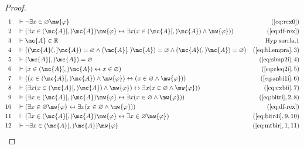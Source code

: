 \begin{proof}
\begin{align}
  1 &&  & \vdash \lnot \exists x \in \varnothing
     \mw{\varphi}&(\mbox{\ref{eq:rex0}})\notag
  \\ 2 &&  & \vdash ( \exists x \in ( \mc{A} [,) \mc{A} ) \mw{\varphi} \leftrightarrow
     \exists x ( x \in ( \mc{A} [,) \mc{A} ) \wedge \mw{\varphi} )
     )&(\mbox{\ref{eq:df-rex}})\notag
  \\ 3 &&  & \vdash \mc{A} \in \mathbb{R}&\text{Hyp~sorrla.1}\notag%
  \\ 4 &&  & \vdash ( ( \mc{A} (,] \mc{A} ) = \varnothing \wedge ( \mc{A} [,) \mc{A} ) =
     \varnothing \wedge ( \mc{A} (,) \mc{A} ) = \varnothing
     )&(\mbox{\ref{eq:bl.empra}},3)\notag
  \\ 5 &&  & \vdash ( \mc{A} [,) \mc{A} ) = \varnothing&(\mbox{\ref{eq:simp2i}},4)\notag
  \\ 6 &&  & \vdash ( x \in ( \mc{A} [,) \mc{A} ) \leftrightarrow x \in \varnothing
     )&(\mbox{\ref{eq:eleq2i}},5)\notag
  \\ 7 &&  & \vdash ( ( x \in ( \mc{A} [,) \mc{A} ) \wedge \mw{\varphi} ) \leftrightarrow
     ( x \in \varnothing \wedge \mw{\varphi} )
     )&(\mbox{\ref{eq:anbi1i}},6)\notag
  \\ 8 &&  & \vdash ( \exists x ( x \in ( \mc{A} [,) \mc{A} ) \wedge \mw{\varphi} )
     \leftrightarrow \exists x ( x \in \varnothing \wedge
     \mw{\varphi} ) )&(\mbox{\ref{eq:exbii}},7)\notag
  \\ 9 &&  & \vdash ( \exists x \in ( \mc{A} [,) \mc{A} ) \mw{\varphi} \leftrightarrow
     \exists x ( x \in \varnothing \wedge \mw{\varphi} )
     )&(\mbox{\ref{eq:bitri}},2,8)\notag
  \\ 10 &&  & \vdash ( \exists x \in \varnothing \mw{\varphi} \leftrightarrow
     \exists x ( x \in \varnothing \wedge \mw{\varphi} )
     )&(\mbox{\ref{eq:df-rex}})\notag
  \\ 11 &&  & \vdash ( \exists x \in ( \mc{A} [,) \mc{A} ) \mw{\varphi} \leftrightarrow
     \exists x \in \varnothing \mw{\varphi}
     )&(\mbox{\ref{eq:bitr4i}},9,10)\notag
  \\ 12 &&  & \vdash \lnot \exists x \in ( \mc{A} [,) \mc{A} )
     \mw{\varphi}&(\mbox{\ref{eq:mtbir}},1,11)\notag
\end{align}
\end{proof}

